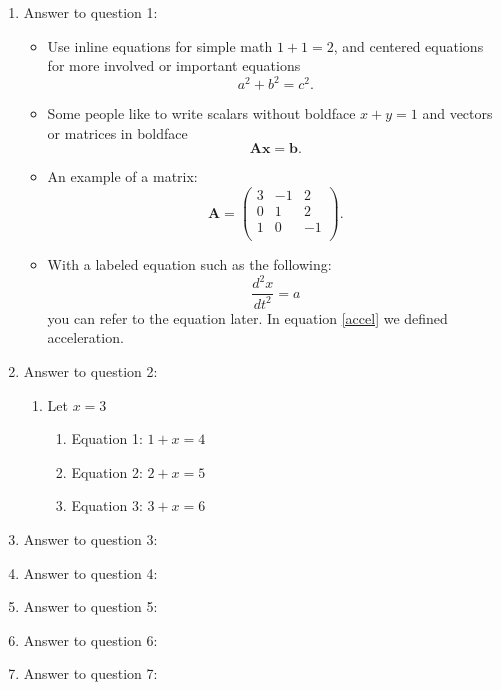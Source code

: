 \documentclass{article}
\begin{document}
	\begin{enumerate}
		\item Answer to question 1:
			\begin{itemize}
				\item Use inline equations for simple math $1+1=2$, and centered equations for more involved or important equations
					\begin{equation}
					    a^2 + b^2 = c^2.
					\end{equation}
				\item Some people like to write scalars without boldface $x+y=1$ and vectors or matrices in boldface
					\begin{equation}
					    \mathbf{A} \mathbf{x} = \mathbf{b}.
					\end{equation}
				\item An example of a matrix:
					\begin{equation}
					    \mathbf{A} = \left(
					    \begin{array}{ccc}
						    3 & -1 & 2 \\ 	
						    0 & 1 & 2 \\ 
						    1 & 0 & -1 \\
						\end{array} 
						\right).  
					\end{equation}
				\item With a labeled equation such as the following:
					\begin{equation}
					    \label{accel}
					    \frac{d^2 x}{d t^2} = a
					\end{equation}
					you can refer to the equation later. In equation \ref{accel} we defined acceleration.
			\end{itemize}
		\item Answer to question 2:
			\begin{enumerate}
				\item Let $x = 3$
				\begin{enumerate}
					\item Equation 1: $1 + x = 4$
					\item Equation 2: $2 + x = 5$
					\item Equation 3: $3 + x = 6$
				\end{enumerate}
			\end{enumerate}
		\item Answer to question 3:
		
		\item Answer to question 4:
		
		\item Answer to question 5:
		
		\item Answer to question 6:
		
		\item Answer to question 7:
		
	\end{enumerate}
\end{document}
